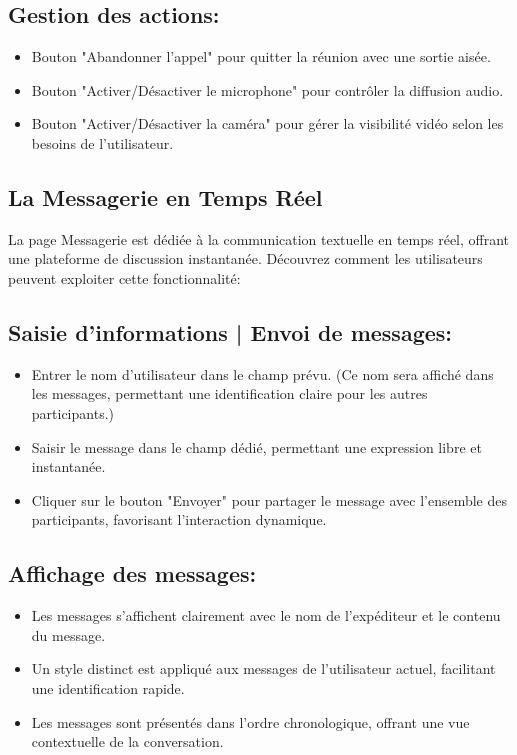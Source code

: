 \documentclass[12pt, a4paper, oneside]{thesis}
\begin{document}
\subsection*{Gestion des actions:}
\begin{itemize}
  \item Bouton "Abandonner l'appel" pour quitter la réunion avec une sortie aisée.
  \item Bouton "Activer/Désactiver le microphone" pour contrôler la diffusion audio.
  \item Bouton "Activer/Désactiver la caméra" pour gérer la visibilité vidéo selon les besoins de l'utilisateur.
\end{itemize}

\newpage

\subsection{La Messagerie en Temps Réel}

La page Messagerie est dédiée à la communication textuelle en temps réel, offrant une plateforme de discussion instantanée. Découvrez comment les utilisateurs peuvent exploiter cette fonctionnalité:

\subsection*{Saisie d'informations | Envoi de messages:}
\begin{itemize}
  \item Entrer le nom d'utilisateur dans le champ prévu. (Ce nom sera affiché dans les messages, permettant une identification claire pour les autres participants.)
  \item Saisir le message dans le champ dédié, permettant une expression libre et instantanée.
  \item Cliquer sur le bouton "Envoyer" pour partager le message avec l'ensemble des participants, favorisant l'interaction dynamique.
\end{itemize}

\subsection*{Affichage des messages:}
\begin{itemize}
  \item Les messages s'affichent clairement avec le nom de l'expéditeur et le contenu du message.
  \item Un style distinct est appliqué aux messages de l'utilisateur actuel, facilitant une identification rapide.
  \item Les messages sont présentés dans l'ordre chronologique, offrant une vue contextuelle de la conversation.
\end{itemize}
\end{document}

